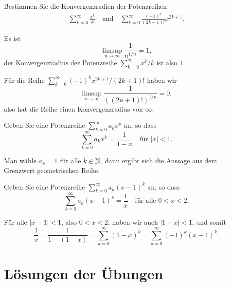 \documentclass[a4paper,10pt]{article}
\begin{document}
\begin{question}
 Bestimmen Sie die Konvergenzradien der Potenzreihen
 \begin{align*}
  \sum_{k=0}^\infty \frac{x^k}{k}
  \quad
  \text{und}
  \quad
  \sum_{k=0}^\infty \frac{(-1)^k}{(2k+1)!} x^{2k+1}.
 \end{align*}
\end{question}
\begin{solution}
 Es ist
 \[
  \limsup_{n \to \infty} \frac{1}{n^{1/n}} = 1,
 \]
 der Konvergenzradius der Potenzreihe $\sum_{k=0}^\infty x^k/k$ ist also $1$.
 
 Für die Reihe $\sum_{k=0}^\infty (-1)^k x^{2k+1}/(2k+1)!$ haben wir
 \[
  \limsup_{n \to \infty} \frac{1}{((2n+1)!)^{1/n}}
  = 0,
 \]
 also hat die Reihe einen Konvergenzradius von $\infty$.
\end{solution}


\begin{question}
Geben Sie eine Potenzreihe $\sum_{k=0}^\infty a_k x^k$ an, so dass
\[
 \sum_{k=0}^\infty a_k x^k = \frac{1}{1-x} \quad \text{für $|x| < 1$}.
\]
\end{question}
\begin{solution}
 Man wähle $a_k = 1$ für alle $k \in \mathbb{N}$, dann ergibt sich die Aussage aus dem Grenzwert geometrischen Reihe.
\end{solution}


\begin{question}
 Geben Sie eine Potenzreihe $\sum_{k=0}^\infty a_k (x-1)^k$ an, so dass
 \[
  \sum_{k=0}^\infty a_k (x-1)^k = \frac{1}{x} \quad \text{für alle $0 < x < 2$}.
 \]
\end{question}
\begin{solution}
 Für alle $|x-1| < 1$, also $0 < x < 2$, haben wir auch $|1-x| < 1$, und somit
 \[
  \frac{1}{x}
  = \frac{1}{1-(1-x)}
  = \sum_{k=0}^\infty (1-x)^k
  = \sum_{k=0}^\infty (-1)^k (x-1)^k.
 \]
\end{solution}















\newpage





\section{Lösungen der Übungen}

\printsolutions
\end{document}
